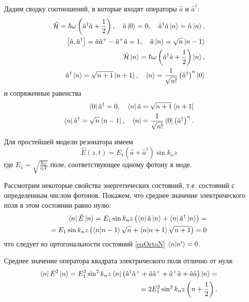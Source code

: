 Дадим сводку соотношений, в которые входят операторы $\hat{a}$ и $\hat{a}^{\dag}$:
\begin{eqnarray}
\hat{\mathcal{H}} = \hbar \omega \left(\hat{a}^{\dag}\hat{a} +
\frac{1}{2} \right),
\quad
\hat{a}\ket{0} = 0,
\quad
\hat{a}^{\dag}\hat{a}\ket{n} = \hat{n}\ket{n},
\nonumber \\
\left[\hat{a}, \hat{a}^{\dag}\right] = \hat{a} \hat{a}^{+} - \hat{a}^{+}
\hat{a} = 1,
\quad
\hat{a}\ket{n} = \sqrt{n}\ket{n - 1}
\nonumber \\
\hat{\mathcal{H}}\ket{n} = \hbar \omega \left(\hat{a}^{\dag}\hat{a} +
\frac{1}{2} \right)\ket{n},
\nonumber \\
\hat{a}^{\dag}\ket{n} = \sqrt{n + 1}\ket{n + 1},
\quad
\ket{n} = \frac{1}{\sqrt{n!}}\left(\hat{a}^{\dag}\right)^n\ket{0}
\end{eqnarray}
и сопряженные равенства
\begin{eqnarray}
\bra{0}\hat{a}^{\dag} = 0,
\quad
\bra{n}\hat{a} = \sqrt{n + 1}\bra{n + 1}
\nonumber \\
\bra{n}\hat{a}^{\dag} = \sqrt{n}\bra{n - 1},
\quad
\bra{n} =  \frac{1}{\sqrt{n!}} \bra{0}\left(\hat{a}^{\dag}\right)^n.
\end{eqnarray}

Для простейшей модели резонатора имеем
\[
\hat{E}\left(z, t\right) = E_1\left( \hat{a} +
\hat{a}^{\dag}\right) \sin k_n z
\]
где $E_1 = \sqrt{\frac{\hbar \omega}{\varepsilon_0 V}}$  поле,
соответствующее одному фотону в моде.  

Рассмотрим некоторые свойства энергетических состояний, т.е. состояний
с определенным числом фотонов. Покажем, что среднее значение
электрического поля в этом состоянии равно нулю: 
\begin{eqnarray}
\bra{n}\hat{E}\ket{n} = 
E_1 \sin k_n z \left( \bra{n}\hat{a}\ket{n} +
\bra{n}\hat{a}^{\dag}\ket{n}\right) =
\nonumber \\
= E_1 \sin k_n z \left( \bra{n}\ket{n - 1} \sqrt{n} +
\bra{n}\ket{n + 1} \sqrt{n + 1}
\right) = 0
\label{eqCh1_E_middle}
\end{eqnarray}
что следует из ортогональности состояний \eqref{eqOrtoN}
$\bra{n}\ket{n'} = 0$.

Среднее значение оператора квадрата электрического поля отлично от нуля:
\begin{eqnarray}
\bra{n}\hat{E}^2\ket{n} = 
E_1^2 \sin^2 k_n z \bra{n}
\left(
\hat{a}^{\dag} \hat{a}^{+} + \hat{a} \hat{a}^{+} + \hat{a}^{+} \hat{a} +
\hat{a} \hat{a}
\right)
\ket{n} =
\nonumber \\
= 2 E_1^2 \sin^2 k_n z \left( n + \frac{1}{2}
\right).
\label{eqCh1_E2_middle}
\end{eqnarray}

